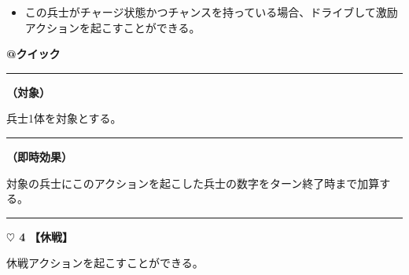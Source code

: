 \documentclass[twocolumn,a5paper,papersize,10pt]{jarticle}
\begin{document}
\vspace{-1zh}%
\begin{itemize}
\setlength{\leftskip}{-0.3cm}
\setlength{\parskip}{0pt} %

\item この兵士がチャージ状態かつチャンスを持っている場合、ドライブして激励アクションを起こすことができる。
\vspace{-1zh}%
\end{itemize}

\begin{tcolorbox}[title={\small\bf【Action】激励}{\scriptsize （兵士起因）}]

{\scriptsize\bf @クイック }

\vspace{1mm} %
\hrule height 0.1mm depth 0mm width 62mm %
\vspace{1mm} %

{\bf（対象）}

兵士1体を対象とする。

\vspace{1mm} %
\hrule height 0.1mm depth 0mm width 62mm %
\vspace{1mm} %

{\bf（即時効果）}

対象の兵士にこのアクションを起こした兵士の数字をターン終了時まで加算する。

\vspace{1mm} %
\end{tcolorbox}

\vspace{-1zh}
  
 

\vspace{3mm} %
\hrule height 0.5mm depth 0mm width 66.5mm %
\vspace{1mm} %
{\Large\bf $\heartsuit$ 4} {\normalsize\bf【休戦】} %
\vspace{1mm} %

休戦アクションを起こすことができる。
\end{document}
